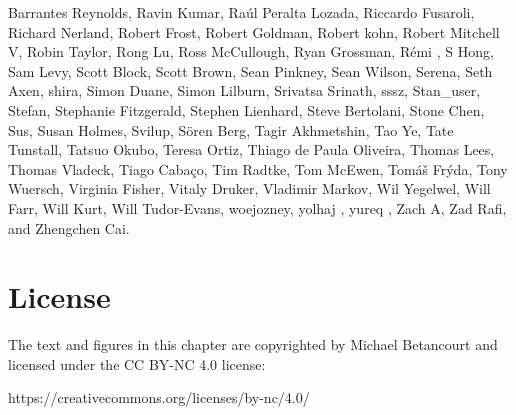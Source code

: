 \documentclass[
  letterpaper,
  DIV=11,
  numbers=noendperiod]{scrartcl}
\begin{document}
Barrantes Reynolds, Ravin Kumar, Raúl Peralta Lozada, Riccardo Fusaroli,
Richard Nerland, Robert Frost, Robert Goldman, Robert kohn, Robert
Mitchell V, Robin Taylor, Rong Lu, Ross McCullough, Ryan Grossman, Rémi
, S Hong, Sam Levy, Scott Block, Scott Brown, Sean Pinkney, Sean Wilson,
Serena, Seth Axen, shira, Simon Duane, Simon Lilburn, Srivatsa Srinath,
sssz, Stan\_user, Stefan, Stephanie Fitzgerald, Stephen Lienhard, Steve
Bertolani, Stone Chen, Sus, Susan Holmes, Svilup, Sören Berg, Tagir
Akhmetshin, Tao Ye, Tate Tunstall, Tatsuo Okubo, Teresa Ortiz, Thiago de
Paula Oliveira, Thomas Lees, Thomas Vladeck, Tiago Cabaço, Tim Radtke,
Tom McEwen, Tomáš Frýda, Tony Wuersch, Virginia Fisher, Vitaly Druker,
Vladimir Markov, Wil Yegelwel, Will Farr, Will Kurt, Will Tudor-Evans,
woejozney, yolhaj , yureq , Zach A, Zad Rafi, and Zhengchen Cai.

\section*{License}\label{license}

The text and figures in this chapter are copyrighted by Michael
Betancourt and licensed under the CC BY-NC 4.0 license:

https://creativecommons.org/licenses/by-nc/4.0/
\end{document}
